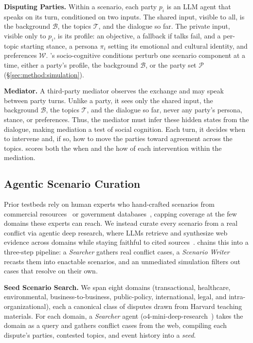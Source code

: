 \smallskip\smallskip\noindent\textbf{{Disputing Parties.}}
Within a scenario, each party $p_i$ is an LLM agent that speaks on its turn, conditioned on two inputs. The shared input, visible to all, is the background $\mathcal{B}$, the topics $\mathcal{T}$, and the dialogue so far. The private input, visible only to $p_i$, is its profile: an objective, a fallback if talks fail, and a per-topic starting stance, a persona $\pi_i$ setting its emotional and cultural identity, and preferences $\mathcal{W}$. \algname{}'s socio-cognitive conditions perturb one scenario component at a time, either a party's profile, the background $\mathcal{B}$, or the party set $\mathcal{P}$ (\S\ref{sec:method:simulation}).

\smallskip\smallskip\noindent\textbf{{Mediator.}}
A third-party mediator observes the exchange and may speak between party turns. Unlike a party, it sees only the shared input, the background $\mathcal{B}$, the topics $\mathcal{T}$, and the dialogue so far, never any party's persona, stance, or preferences. Thus, the mediator must infer these hidden states from the dialogue, making mediation a test of social cognition. Each turn, it decides when to intervene and, if so, how to move the parties toward agreement across the topics. \algname{} scores both the when and the how of each intervention within the mediation.

\subsection{Agentic Scenario Curation}
\label{sec:method:construction}

Prior testbeds rely on human experts who hand-crafted scenarios from commercial resources~\citep{liu2025promediate} or government databases~\citep{chen2026simulating}, capping coverage at the few domains these experts can reach. We instead curate every scenario from a real conflict via agentic deep research, where LLMs retrieve and synthesize web evidence across domains while staying faithful to cited sources~\citep{gou2026mind2web, tao2025webshaper}. \algname{} chains this into a three-step pipeline: a \textit{Searcher} gathers real conflict cases, a \textit{Scenario Writer} recasts them into enactable scenarios, and an unmediated simulation filters out cases that resolve on their own.

\smallskip\smallskip\noindent\textbf{{Seed Scenario Search.}}
We span eight domains (transactional, healthcare, environmental, business-to-business, public-policy, international, legal, and intra-organizational), each a canonical class of disputes drawn from Harvard teaching materials. For each domain, a \textit{Searcher} agent (o4-mini-deep-research~\citep{openai2025deepresearch}) takes the domain as a query and gathers conflict cases from the web, compiling each dispute's parties, contested topics, and event history into a \emph{seed}.

